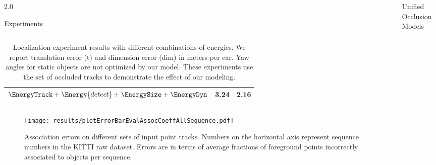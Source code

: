\documentclass[handout,final]{beamer}
\newlength{\sepwid}
\newlength{\onecolwid}
\begin{document}
\begin{frame}[t]
\begin{columns}[t]
\begin{column}{2.0\onecolwid}
\begin{block}{Experiments}
\begin{columns}[t]
\begin{table}
\begin{tabular}{lrr}
              $\EnergyTrack + \Energy{detect} +\EnergySize+\EnergyDyn$             
              & {\bf 3.24}  & 2.16\\
              \bottomrule
            \end{tabular}
            \caption{\small Localization experiment results with different combinations of energies. We report translation error (t) and dimension error (dim) in meters per car. Yaw angles for static objects are not optimized by our model. These experiments use the set of occluded tracks to demonstrate the effect of our modeling.}
          \end{table}
        \end{columns}
        \newlength{\tblimgwidth}
        \setlength{\tblimgwidth}{0.080\textwidth}
        
        \begin{figure}[!!t]
          \centering
          \texttt{[image: results/plotErrorBarEvalAssocCoeffAllSequence.pdf]}
		  \caption{\small Association errors on different sets of input point tracks. Numbers on the horizontal axis represent sequence numbers in the KITTI raw dataset. Errors are in terms of average fractions of foreground points incorrectly associated to objects per sequence.}
        \end{figure}
      \end{block}
    \end{column}
    \begin{column}{\sepwid}\end{column}			%
    \begin{column}{\onecolwid}
      \begin{block}{Unified Occlusion Models}  
      

\end{block}
\end{column}
\end{columns}
\end{frame}
\end{document}
